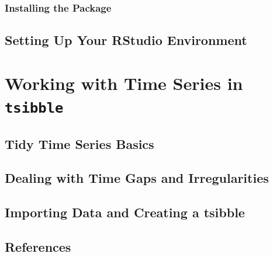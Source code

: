 \documentclass[
  letterpaper,
  DIV=11,
  numbers=noendperiod]{scrreprt}
\newlength{\cslhangindent}
\newenvironment{CSLReferences}[2] %
 {\begin{list}{}{%
  \setlength{\itemindent}{0pt}
  \setlength{\leftmargin}{0pt}
  \setlength{\parsep}{0pt}
  \ifodd #1
   \setlength{\leftmargin}{\cslhangindent}
   \setlength{\itemindent}{-1\cslhangindent}
  \fi
  \setlength{\itemsep}{#2\baselineskip}}}
 {\end{list}}
\begin{document}
\section{Installing the Package}\label{installing-the-package}

\chapter{Setting Up Your RStudio
Environment}\label{sec-setting-up-your-rstudio-environment}

\part{Working with Time Series in \texttt{tsibble}}

\chapter{Tidy Time Series Basics}\label{tidy-time-series-basics}

\chapter{Dealing with Time Gaps and
Irregularities}\label{dealing-with-time-gaps-and-irregularities}

\chapter{Importing Data and Creating a
tsibble}\label{importing-data-and-creating-a-tsibble}


\chapter*{References}\label{references}


\label{refs}
\begin{CSLReferences}{0}{1}
\end{CSLReferences}
\end{document}
